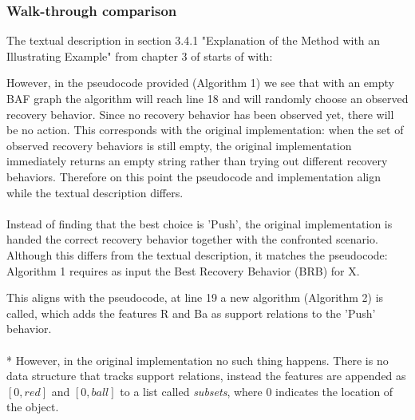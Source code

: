 \documentclass{article}
\begin{document}
\subsubsection{Walk-through comparison}
The textual description in section 3.4.1 "Explanation of the Method with an 
Illustrating Example" from chapter 3 of \cite{ayoobi2023fullthesis} starts of with:
\begin{quote}
\textit{}
\end{quote}
However, in the pseudocode provided (Algorithm 1) we see that with an empty BAF graph the algorithm will reach line 18 and will randomly choose an observed recovery behavior. Since no recovery behavior has been observed yet, there will be no action. This corresponds with the original implementation: when the set of observed recovery behaviors is still empty, the original implementation immediately returns an empty string rather than trying out different recovery behaviors. Therefore on this point the pseudocode and implementation align while the textual description differs. 
\\\\
Instead of finding that the best choice is 'Push', the original implementation is handed the correct recovery behavior together with the confronted scenario. Although this differs from the textual description, it matches the pseudocode: Algorithm 1 requires as input the Best Recovery Behavior (BRB) for X. 
\begin{quote}
\textit{}
\end{quote}
This aligns with the pseudocode, at line 19 a new algorithm (Algorithm 2) is called, which adds the features R and Ba as support relations to the 'Push' behavior. 
\\\\*
However, in the original implementation no such thing happens. There is no data structure that tracks support relations, instead the features are appended as $[0, red]$ and $[0, ball]$ to a list called \textit{subsets}, where 0 indicates the location of the object. 
\\\\
\end{document}
